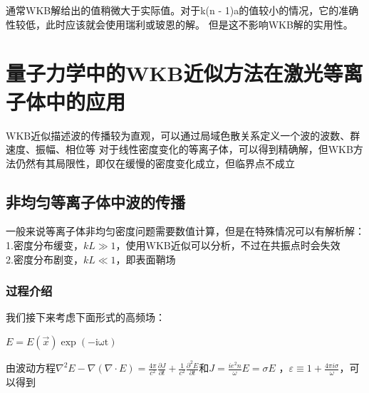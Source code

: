 \documentclass[12pt, a4paper, oneside]{ctexart}
\begin{document}
\begin{spacing}{2.0}
通常WKB解给出的值稍微大于实际值\cite{5472149}。对于k(n - 1)a的值较小的情况，它的准确性较低，此时应该就会使用瑞利或玻恩的解。
但是这不影响WKB解的实用性。


\section{量子力学中的WKB近似方法在激光等离子体中的应用}
WKB近似描述波的传播较为直观，可以通过局域色散关系定义一个波的波数、群速度、振幅、相位等
对于线性密度变化的等离子体，可以得到精确解，但WKB方法仍然有其局限性，即仅在缓慢的密度变化成立，但临界点不成立
\subsection{非均匀等离子体中波的传播}
一般来说等离子体非均匀密度问题需要数值计算，但是在特殊情况可以有解析解：
1.密度分布缓变，$kL\gg 1$，使用WKB近似可以分析，不过在共振点时会失效\cite{lasertextbook11223}
\\
2.密度分布剧变，$kL\ll 1$，即表面鞘场
\subsubsection{过程介绍}
我们接下来考虑下面形式的高频场：
\begin{center}
    $\displaystyle E = E(\vec{x})\exp (-\mathrm{i\omega t})$
\end{center}
由波动方程$\displaystyle \nabla^{2}E-\nabla(\nabla\cdot E)=\frac{4\pi}{c^{2}}\frac{\partial J}{\partial t}+\frac{1}{c^{2}}\frac{\partial^{2}E}{\partial t}$和$\displaystyle J = \frac{ie^2n}{\omega}E = \sigma E$
，$\displaystyle \varepsilon\equiv 1+\frac{4\pi i \sigma}{\omega}$，可以得到


\end{spacing}
\end{document}
